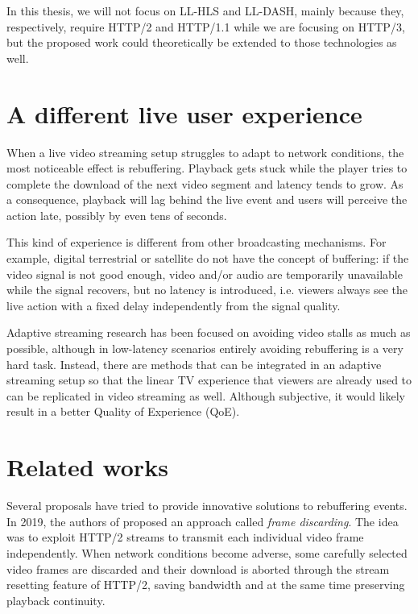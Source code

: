 In this thesis, we will not focus on LL-HLS and LL-DASH, mainly because they, respectively, require HTTP/2 and HTTP/1.1 while we are focusing on HTTP/3, but the proposed work could theoretically be extended to those technologies as well.

\section{A different live user experience}
\label{sec:intro/experience}

When a live video streaming setup struggles to adapt to network conditions, the most noticeable effect is rebuffering. Playback gets stuck while the player tries to complete the download of the next video segment and latency tends to grow. As a consequence, playback will lag behind the live event and users will perceive the action late, possibly by even tens of seconds.

This kind of experience is different from other broadcasting mechanisms. For example, digital terrestrial or satellite do not have the concept of buffering: if the video signal is not good enough, video and/or audio are temporarily unavailable while the signal recovers, but no latency is introduced, i.e. viewers always see the live action with a fixed delay independently from the signal quality.

Adaptive streaming research has been focused on avoiding video stalls as much as possible, although in low-latency scenarios entirely avoiding rebuffering is a very hard task. Instead, there are methods that can be integrated in an adaptive streaming setup so that the linear TV experience that viewers are already used to can be replicated in video streaming as well. Although subjective, it would likely result in a better Quality of Experience (QoE).

\section{Related works}
\label{sec:intro/related}

Several proposals have tried to provide innovative solutions to rebuffering events. In 2019, the authors of \cite{framediscarding} proposed an approach called \textit{frame discarding}. The idea was to exploit HTTP/2 streams to transmit each individual video frame independently. When network conditions become adverse, some carefully selected video frames are discarded and their download is aborted through the stream resetting feature of HTTP/2, saving bandwidth and at the same time preserving playback continuity.

